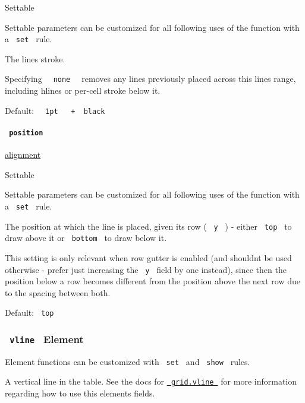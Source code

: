 {{ Settable }}

\label{definitions-hline-stroke-settable-tooltip}
Settable parameters can be customized for all following uses of the
function with a \texttt{\ set\ } rule.

The line\textquotesingle s stroke.

Specifying \texttt{\ }{\texttt{\ none\ }}\texttt{\ } removes any lines
previously placed across this line\textquotesingle s range, including
hlines or per-cell stroke below it.

Default:
\texttt{\ }{\texttt{\ 1pt\ }}\texttt{\ }{\texttt{\ +\ }}\texttt{\ black\ }

\paragraph{\texorpdfstring{\texttt{\ position\ }}{ position }}\label{definitions-hline-position}

\href{/docs/reference/layout/alignment/}{alignment}

{{ Settable }}

\label{definitions-hline-position-settable-tooltip}
Settable parameters can be customized for all following uses of the
function with a \texttt{\ set\ } rule.

The position at which the line is placed, given its row ( \texttt{\ y\ }
) - either \texttt{\ top\ } to draw above it or \texttt{\ bottom\ } to
draw below it.

This setting is only relevant when row gutter is enabled (and
shouldn\textquotesingle t be used otherwise - prefer just increasing the
\texttt{\ y\ } field by one instead), since then the position below a
row becomes different from the position above the next row due to the
spacing between both.

Default: \texttt{\ top\ }

\subsubsection{\texorpdfstring{\texttt{\ vline\ } {{ Element
}}}{ vline   Element }}\label{definitions-vline}

\label{definitions-vline-element-tooltip}
Element functions can be customized with \texttt{\ set\ } and
\texttt{\ show\ } rules.

A vertical line in the table. See the docs for
\href{/docs/reference/layout/grid/\#definitions-vline}{\texttt{\ grid.vline\ }}
for more information regarding how to use this element\textquotesingle s
fields.

